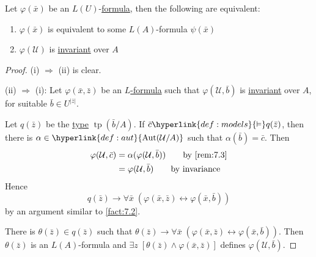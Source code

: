 \documentclass{article}
\let\models\vDash
\DeclareMathOperator{\Aut}{Aut}
\DeclareMathOperator{\tp}{tp}
\newcommand{\named}[1]{\textbf{#1}\index{#1}}
\begin{document}
\begin{nprop}\label{prop:7.5}
  Let $\varphi(\bar{x})$ be an \hyperlink{def:la}{$L(U)$}-\hyperlink{def:form}{formula}, then the following are equivalent:
  \begin{enumerate}[label=(\roman*)]
    \item $\varphi(\bar{x})$ is equivalent to some $L(A)$-formula $\psi(\bar{x})$
    \item $ \varphi(\mathcal{U}) $ is \hyperlink{def:inv}{invariant} over $A$
  \end{enumerate}
\end{nprop}
\begin{proof}
  (i) $\Rightarrow$ (ii) is clear.

  (ii) $\Rightarrow$ (i): Let $\varphi(\bar{x},\bar{z})$ be an \hyperlink{def:form}{$L$-formula} such that $\varphi(\mathcal{U},\bar{b})$ is \hyperlink{def:inv}{invariant} over $A$, for suitable $ \bar{b} \in U^{|\bar{z}|}$.

  Let $q(\bar{z})$ be the \hyperlink{def:type}{type} $\tp(\bar{b}/A)$.
  If $ \bar{c}\hyperlink{def:models}{\models} q(\bar{z}) $, then there is $ \alpha\in\hyperlink{def:aut}{\Aut(\mathcal{U}/A)}$
  such that $\alpha(\bar{b})=\bar{c}$.
  Then
    \begin{align*}
      \varphi(\mathcal{U},\bar{c})&=\alpha(\varphi(\mathcal{U},\bar{b}))\qquad\text{by \cref{rem:7.3}} \\
                                       &= \varphi(\mathcal{U},\bar{b})\qquad\text{by invariance}
    \end{align*}
  Hence
  \begin{equation*}
    q(\bar{z})\to \forall\bar{x}\;(\varphi(\bar{x},\bar{z})\leftrightarrow\varphi(\bar{x},\bar{b}))
  \end{equation*}
  by an argument similar to \cref{fact:7.2}.

  There is $\theta(\bar{z})\in q(\bar{z})$ such that $\theta(\bar{z})\to\forall\bar{x}\;(\varphi(\bar{x},\bar{z})\leftrightarrow\varphi(\bar{x},\bar{b}))$.
  Then $\theta(\bar{z})$ is an $L(A)$-formula and $\exists z\;[\theta(\bar{z})\land\varphi(\bar{x},\bar{z})]$ defines $ \varphi(\mathcal{U},\bar{b}) $.
\end{proof}
\end{document}
